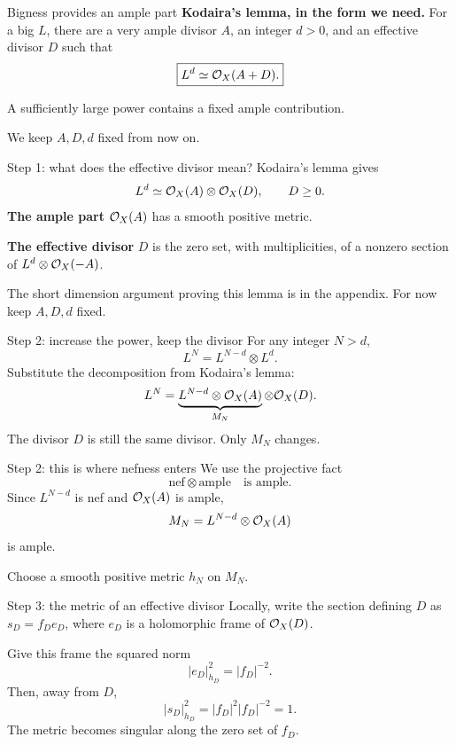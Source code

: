 \begin{frame}{Bigness provides an ample part}
\textbf{Kodaira's lemma, in the form we need.}
For a big \(L\), there are a very ample divisor \(A\), an integer \(d>0\), and an effective divisor \(D\) such that
\[
\boxed{L^d\simeq\mathcal O_X(A+D).}
\]
\par\bigskip
A sufficiently large power contains a fixed ample contribution.
\par\medskip
We keep \(A,D,d\) fixed from now on.
\end{frame}

\begin{frame}{Step 1: what does the effective divisor mean?}
Kodaira's lemma gives
\[
L^d\simeq\mathcal O_X(A)\otimes\mathcal O_X(D),\qquad D\ge0.
\]
\textbf{The ample part} \(\mathcal O_X(A)\) has a smooth positive metric.
\par\bigskip
\textbf{The effective divisor} \(D\) is the zero set, with multiplicities, of a nonzero section of \(L^d\otimes\mathcal O_X(-A)\).
\par\bigskip
The short dimension argument proving this lemma is in the appendix.
For now keep \(A,D,d\) fixed.
\end{frame}

\begin{frame}{Step 2: increase the power, keep the divisor}
For any integer \(N>d\),
\[
L^N=L^{N-d}\otimes L^d.
\]
Substitute the decomposition from Kodaira's lemma:
\[
L^N=\underbrace{L^{N-d}\otimes\mathcal O_X(A)}_{M_N}\otimes\mathcal O_X(D).
\]
The divisor \(D\) is still the same divisor. Only \(M_N\) changes.
\end{frame}

\begin{frame}{Step 2: this is where nefness enters}
We use the projective fact
\[
\boxed{\text{nef}\otimes\text{ample}\quad\text{is ample}.}
\]
Since \(L^{N-d}\) is nef and \(\mathcal O_X(A)\) is ample,
\[
M_N=L^{N-d}\otimes\mathcal O_X(A)
\]
is ample.
\par\medskip
Choose a smooth positive metric \(h_N\) on \(M_N\).
\end{frame}

\begin{frame}{Step 3: the metric of an effective divisor}
Locally, write the section defining \(D\) as \(s_D=f_D e_D\), where \(e_D\) is a holomorphic frame of \(\mathcal O_X(D)\).
\par\medskip
Give this frame the squared norm
\[
\boxed{|e_D|_{h_D}^2=|f_D|^{-2}.}
\]
Then, away from \(D\),
\[
|s_D|_{h_D}^2=|f_D|^2|f_D|^{-2}=1.
\]
The metric becomes singular along the zero set of \(f_D\).
\end{frame}

